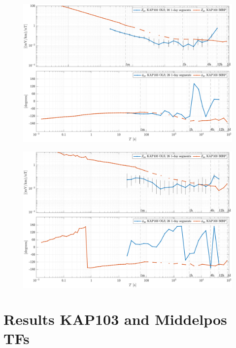 \documentclass{article}
\begin{document}
\begin{figure}[h!]
\centering
\includegraphics[width=\textwidth]{figures/KAP103/transferfnZ_compare-Z_yx_Magnitude_Phase.pdf}
\caption{}
\label{fig:universe}
\end{figure}

\begin{figure}[h!]
\centering
\includegraphics[width=\textwidth]{figures/KAP103/transferfnZ_compare-Z_yy_Magnitude_Phase.pdf}
\caption{}
\label{fig:universe}
\end{figure}

\clearpage

\section{Results KAP103 and Middelpos TFs}
\end{document}
